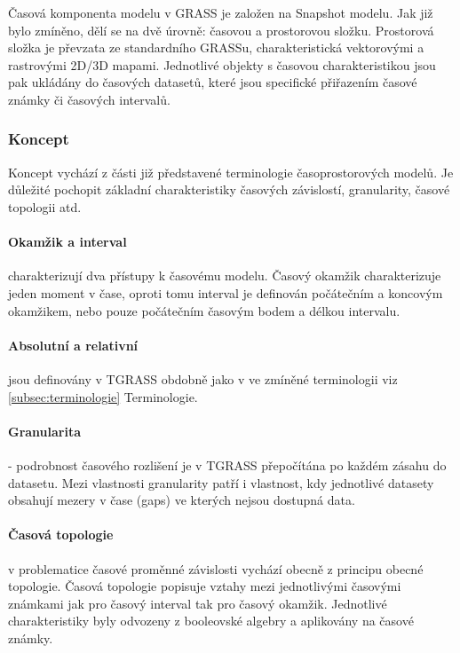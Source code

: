 \documentclass[a4paper,12pt,oneside]{report}
\begin{document}
Časová komponenta modelu v GRASS je založen na Snapshot modelu. Jak již bylo zmíněno,  dělí se na dvě úrovně: časovou a prostorovou složku. Prostorová složka je převzata
ze standardního GRASSu, charakteristická vektorovými a rastrovými
2D/3D mapami. Jednotlivé objekty s časovou charakteristikou jsou pak
ukládány do časových datasetů, které jsou specifické přiřazením časové známky či časových intervalů. 

\subsubsection{Koncept} 
Koncept vychází z části již představené terminologie časoprostorových
modelů. Je důležité pochopit základní charakteristiky časových závislostí,
granularity, časové topologii atd.

\paragraph*{Okamžik a interval} charakterizují dva přístupy k časovému
modelu.  Časový okamžik charakterizuje jeden moment v čase, oproti
tomu interval je definován počátečním  a koncovým okamžikem, nebo pouze
počátečním časovým bodem a délkou intervalu.

\paragraph*{Absolutní a relativní} jsou definovány v TGRASS obdobně jako v 
ve zmíněné terminologii viz \ref{subsec:terminologie} Terminologie.

\paragraph*{Granularita} - podrobnost časového rozlišení je v TGRASS přepočítána po každém zásahu do datasetu. Mezi vlastnosti granularity patří i vlastnost, kdy jednotlivé datasety obsahují mezery v čase (gaps) ve kterých nejsou dostupná data.


\paragraph*{Časová topologie}  v problematice časové proměnné závislosti vychází obecně z principu obecné topologie. Časová topologie popisuje vztahy mezi jednotlivými časovými známkami jak pro časový interval tak pro časový okamžik. Jednotlivé charakteristiky byly
odvozeny z booleovské algebry a aplikovány na časové známky.
\end{document}
